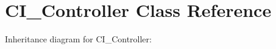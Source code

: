 \hypertarget{class_c_i___controller}{}\section{C\+I\+\_\+\+Controller Class Reference}
\label{class_c_i___controller}


Inheritance diagram for C\+I\+\_\+\+Controller\+:
